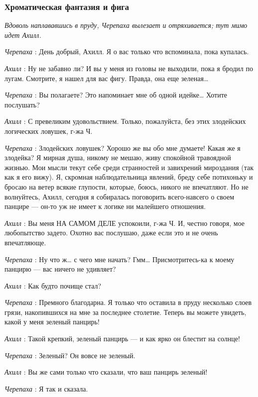 \subsubsection{Хроматическая фантазия и фига}

\emph{Вдоволь наплававшись в пруду, Черепаха вылезает и отряхивается; тут мимо идет Ахилл.}

\emph{Черепаха} : День добрый, Ахилл. Я о вас только что вспоминала, пока купалась.

\emph{Ахилл} : Ну не забавно ли? И вы у меня из головы не выходили, пока я бродил по лугам. Смотрите, я нашел для вас фигу. Правда, она еще зеленая\ldots{}

\emph{Черепаха} : Вы полагаете? Это напоминает мне об одной идейке\ldots{} Хотите послушать?

\emph{Ахилл} : С превеликим удовольствием. Только, пожалуйста, без этих злодейских логических ловушек, г-жа Ч.

\emph{Черепаха} : Злодейских ловушек? Хорошо же вы обо мне думаете! Какая же я злодейка? Я мирная душа, никому не мешаю, живу спокойной травоядной жизнью. Мои мысли текут себе среди странностей и завихрений мироздания (так как я его вижу). Я, скромная наблюдательница явлений, бреду себе потихоньку и бросаю на ветер всякие глупости, которые, боюсь, никого не впечатляют. Но не волнуйтесь, Ахилл, сегодня я собиралась поговорить всего-навсего о своем панцире --- он-то уж не имеет к логике ни малейшего отношения.

\emph{Ахилл} : Вы меня НА САМОМ ДЕЛЕ успокоили, г-жа Ч. И, честно говоря, мое любопытство задето. Охотно вас послушаю, даже если это и не очень впечатляюще.

\emph{Черепаха} : Ну что ж\ldots{} с чего мне начать? Гмм\ldots{} Присмотритесь-ка к моему панцирю --- вас ничего не удивляет?

\emph{Ахилл} : Как будто почище стал?

\emph{Черепаха} : Премного благодарна. Я только что оставила в пруду несколько слоев грязи, накопившихся на мне за последнее столетие. Теперь вы можете увидеть, какой у меня зеленый панцирь!

\emph{Ахилл} : Такой крепкий, зеленый панцирь --- и как ярко он блестит на солнце!

\emph{Черепаха} : Зеленый? Он вовсе не зеленый.

\emph{Ахилл} : Вы же сами только что сказали, что ваш панцирь зеленый!

\emph{Черепаха} : Я так и сказала.

